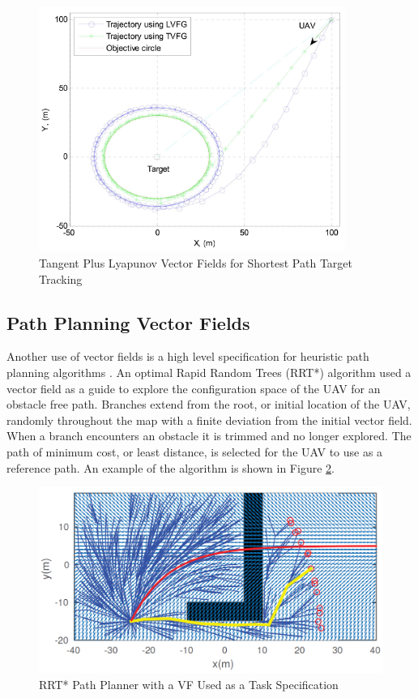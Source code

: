 \documentclass[numbered,pdftex]{ohio-etd}
\begin{document}
\begin{figure}
	\centering
	\includegraphics[width=10cm]{PaperFigures/lyapunovChen}
	\caption{Tangent Plus Lyapunov Vector Fields for Shortest Path Target Tracking \cite{chen_uav_2013}}
	\label{fig:lyapunovChen}
\end{figure}


\subsection{Path Planning Vector Fields}
Another use of vector fields is a high level specification for heuristic path planning algorithms \cite{pereira_framework_2016}. An optimal Rapid Random Trees (RRT*) algorithm used a vector field as a guide to explore the configuration space of the UAV for an obstacle free path. Branches extend from the root, or initial location of the UAV, randomly throughout the map with a finite deviation from the initial vector field. When a branch encounters an obstacle it is trimmed and no longer explored. The path of minimum cost, or least distance, is selected for the UAV to use as a reference path. An example of the algorithm is shown in Figure \ref{fig:rrtvf}.

\begin{figure}[H]
	\centering
	\includegraphics[width=12cm]{PaperFigures/rrtVF}
	\caption{RRT* Path Planner with a VF Used as a Task Specification \cite{pereira_framework_2016}}
	\label{fig:rrtvf}
\end{figure}
\end{document}
